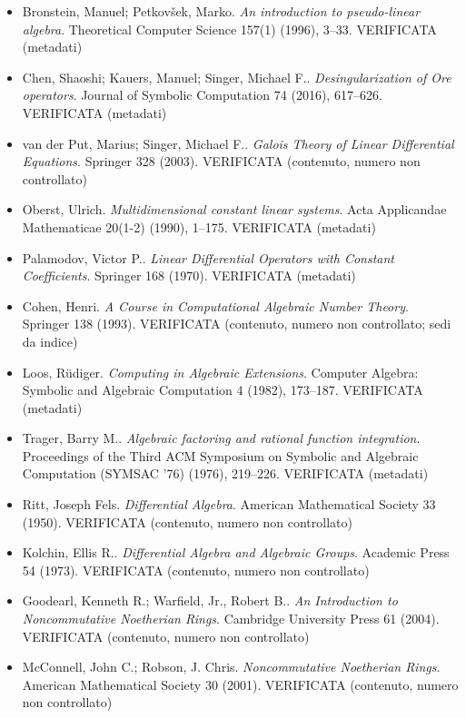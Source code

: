 \documentclass[11pt]{article}
\theoremstyle{plain}
\theoremstyle{definition}
\theoremstyle{remark}
\begin{document}
\begin{itemize}[itemsep=2pt,leftmargin=1.2em,font=\small]
\item Bronstein, Manuel; Petkov{\v s}ek, Marko. \emph{An introduction to pseudo-linear algebra}. Theoretical Computer Science 157(1) (1996), 3--33. \textsf{\footnotesize VERIFICATA (metadati)}
\item Chen, Shaoshi; Kauers, Manuel; Singer, Michael F.. \emph{Desingularization of {O}re operators}. Journal of Symbolic Computation 74 (2016), 617--626. \textsf{\footnotesize VERIFICATA (metadati)}
\item van der Put, Marius; Singer, Michael F.. \emph{Galois Theory of Linear Differential Equations}. Springer 328 (2003). \textsf{\footnotesize VERIFICATA (contenuto, numero non controllato)}
\item Oberst, Ulrich. \emph{Multidimensional constant linear systems}. Acta Applicandae Mathematicae 20(1-2) (1990), 1--175. \textsf{\footnotesize VERIFICATA (metadati)}
\item Palamodov, Victor P.. \emph{Linear Differential Operators with Constant Coefficients}. Springer 168 (1970). \textsf{\footnotesize VERIFICATA (metadati)}
\item Cohen, Henri. \emph{A Course in Computational Algebraic Number Theory}. Springer 138 (1993). \textsf{\footnotesize VERIFICATA (contenuto, numero non controllato; sedi da indice)}
\item Loos, R{\"u}diger. \emph{Computing in Algebraic Extensions}. Computer Algebra: Symbolic and Algebraic Computation 4 (1982), 173--187. \textsf{\footnotesize VERIFICATA (metadati)}
\item Trager, Barry M.. \emph{Algebraic factoring and rational function integration}. Proceedings of the Third ACM Symposium on Symbolic and Algebraic Computation (SYMSAC '76) (1976), 219--226. \textsf{\footnotesize VERIFICATA (metadati)}
\item Ritt, Joseph Fels. \emph{Differential Algebra}. American Mathematical Society 33 (1950). \textsf{\footnotesize VERIFICATA (contenuto, numero non controllato)}
\item Kolchin, Ellis R.. \emph{Differential Algebra and Algebraic Groups}. Academic Press 54 (1973). \textsf{\footnotesize VERIFICATA (contenuto, numero non controllato)}
\item Goodearl, Kenneth R.; Warfield, Jr., Robert B.. \emph{An Introduction to Noncommutative Noetherian Rings}. Cambridge University Press 61 (2004). \textsf{\footnotesize VERIFICATA (contenuto, numero non controllato)}
\item McConnell, John C.; Robson, J. Chris. \emph{Noncommutative Noetherian Rings}. American Mathematical Society 30 (2001). \textsf{\footnotesize VERIFICATA (contenuto, numero non controllato)}

\end{itemize}
\end{document}
